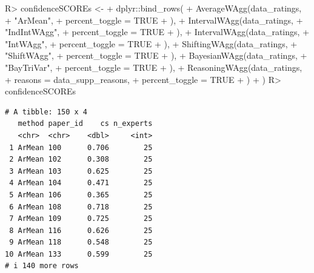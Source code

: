 \documentclass[
  11pt,
  a4paper,
]{article}
\newenvironment{Shaded}{\begin{snugshade}}{\end{snugshade}}
\newcommand{\AttributeTok}[1]{\textcolor[rgb]{0.40,0.45,0.13}{#1}}
\newcommand{\ConstantTok}[1]{\textcolor[rgb]{0.56,0.35,0.01}{#1}}
\newcommand{\FunctionTok}[1]{\textcolor[rgb]{0.28,0.35,0.67}{#1}}
\newcommand{\NormalTok}[1]{\textcolor[rgb]{0.00,0.23,0.31}{#1}}
\newcommand{\OtherTok}[1]{\textcolor[rgb]{0.00,0.23,0.31}{#1}}
\newcommand{\SpecialCharTok}[1]{\textcolor[rgb]{0.37,0.37,0.37}{#1}}
\newcommand{\StringTok}[1]{\textcolor[rgb]{0.13,0.47,0.30}{#1}}
\begin{document}
\begin{Shaded}
\begin{Highlighting}[]
\NormalTok{R}\SpecialCharTok{\textgreater{}}\NormalTok{ confidenceSCOREs }\OtherTok{\textless{}{-}}
\SpecialCharTok{+}\NormalTok{    dplyr}\SpecialCharTok{::}\FunctionTok{bind\_rows}\NormalTok{(}
\SpecialCharTok{+}      \FunctionTok{AverageWAgg}\NormalTok{(data\_ratings,}
\SpecialCharTok{+}        \StringTok{"ArMean"}\NormalTok{,}
\SpecialCharTok{+}        \AttributeTok{percent\_toggle =} \ConstantTok{TRUE}
\SpecialCharTok{+}\NormalTok{      ),}
\SpecialCharTok{+}      \FunctionTok{IntervalWAgg}\NormalTok{(data\_ratings,}
\SpecialCharTok{+}        \StringTok{"IndIntWAgg"}\NormalTok{,}
\SpecialCharTok{+}        \AttributeTok{percent\_toggle =} \ConstantTok{TRUE}
\SpecialCharTok{+}\NormalTok{      ),}
\SpecialCharTok{+}      \FunctionTok{IntervalWAgg}\NormalTok{(data\_ratings,}
\SpecialCharTok{+}        \StringTok{"IntWAgg"}\NormalTok{,}
\SpecialCharTok{+}        \AttributeTok{percent\_toggle =} \ConstantTok{TRUE}
\SpecialCharTok{+}\NormalTok{      ),}
\SpecialCharTok{+}      \FunctionTok{ShiftingWAgg}\NormalTok{(data\_ratings,}
\SpecialCharTok{+}        \StringTok{"ShiftWAgg"}\NormalTok{,}
\SpecialCharTok{+}        \AttributeTok{percent\_toggle =} \ConstantTok{TRUE}
\SpecialCharTok{+}\NormalTok{      ),}
\SpecialCharTok{+}      \FunctionTok{BayesianWAgg}\NormalTok{(data\_ratings,}
\SpecialCharTok{+}        \StringTok{"BayTriVar"}\NormalTok{,}
\SpecialCharTok{+}        \AttributeTok{percent\_toggle =} \ConstantTok{TRUE}
\SpecialCharTok{+}\NormalTok{      ),}
\SpecialCharTok{+}      \FunctionTok{ReasoningWAgg}\NormalTok{(data\_ratings,}
\SpecialCharTok{+}        \AttributeTok{reasons =}\NormalTok{ data\_supp\_reasons,}
\SpecialCharTok{+}        \AttributeTok{percent\_toggle =} \ConstantTok{TRUE}
\SpecialCharTok{+}\NormalTok{      )}
\SpecialCharTok{+}\NormalTok{    )}
\NormalTok{R}\SpecialCharTok{\textgreater{}}\NormalTok{ confidenceSCOREs}
\end{Highlighting}
\end{Shaded}

\begin{verbatim}
# A tibble: 150 x 4
   method paper_id    cs n_experts
   <chr>  <chr>    <dbl>     <int>
 1 ArMean 100      0.706        25
 2 ArMean 102      0.308        25
 3 ArMean 103      0.625        25
 4 ArMean 104      0.471        25
 5 ArMean 106      0.365        25
 6 ArMean 108      0.718        25
 7 ArMean 109      0.725        25
 8 ArMean 116      0.626        25
 9 ArMean 118      0.548        25
10 ArMean 133      0.599        25
# i 140 more rows
\end{verbatim}
\end{document}
